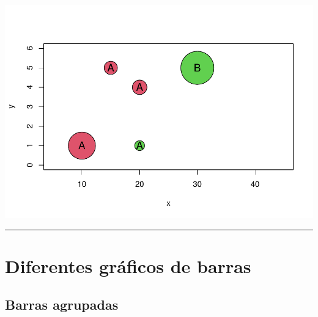 \documentclass[
]{book}
\begin{document}
\begin{center}\includegraphics{AED_files/figure-latex/unnamed-chunk-2-1} \end{center}

\begin{center}\rule{0.5\linewidth}{0.5pt}\end{center}

\section{Diferentes gráficos de barras}\label{diferentes-gruxe1ficos-de-barras}

\subsection{Barras agrupadas}\label{barras-agrupadas}
\end{document}

